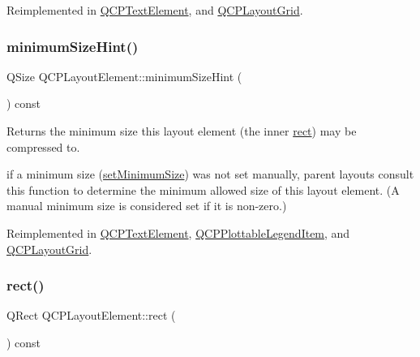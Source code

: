 Reimplemented in \mbox{\hyperlink{class_q_c_p_text_element_a65e5f4c5a852bbff48acef236048354f}{Q\+C\+P\+Text\+Element}}, and \mbox{\hyperlink{class_q_c_p_layout_grid_acb285925df25b54b3db25c7b1804d230}{Q\+C\+P\+Layout\+Grid}}.

\mbox{\label{class_q_c_p_layout_element_ab3fdb5c9a5189bb2dac10d4d25329cd8}} 
\subsubsection{\texorpdfstring{minimum\+Size\+Hint()}{minimumSizeHint()}}
{\footnotesize\ttfamily Q\+Size Q\+C\+P\+Layout\+Element\+::minimum\+Size\+Hint (\begin{DoxyParamCaption}{ }\end{DoxyParamCaption}) const\hspace{0.3cm}{\ttfamily [virtual]}}

Returns the minimum size this layout element (the inner \mbox{\hyperlink{class_q_c_p_layout_element_a208effccfe2cca4a0eaf9393e60f2dd4}{rect}}) may be compressed to.

if a minimum size (\mbox{\hyperlink{class_q_c_p_layout_element_a5dd29a3c8bc88440c97c06b67be7886b}{set\+Minimum\+Size}}) was not set manually, parent layouts consult this function to determine the minimum allowed size of this layout element. (A manual minimum size is considered set if it is non-\/zero.) 

Reimplemented in \mbox{\hyperlink{class_q_c_p_text_element_a5b6e94c79d0cd56c13cbedbb7021ea08}{Q\+C\+P\+Text\+Element}}, \mbox{\hyperlink{class_q_c_p_plottable_legend_item_a923b8b0e2b888cbb00abae0783edf509}{Q\+C\+P\+Plottable\+Legend\+Item}}, and \mbox{\hyperlink{class_q_c_p_layout_grid_a361c3f5906c21a6709cb8daf5a9e019f}{Q\+C\+P\+Layout\+Grid}}.

\mbox{\label{class_q_c_p_layout_element_a208effccfe2cca4a0eaf9393e60f2dd4}} 
\subsubsection{\texorpdfstring{rect()}{rect()}}
{\footnotesize\ttfamily Q\+Rect Q\+C\+P\+Layout\+Element\+::rect (\begin{DoxyParamCaption}{ }\end{DoxyParamCaption}) const\hspace{0.3cm}{\ttfamily [inline]}}

